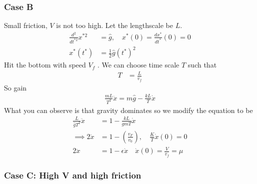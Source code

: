 \documentclass{article}
\theoremstyle{remark}
\begin{document}
   \subsubsection{Case B}%
   \label{ssub:case_b}
   Small friction,  $V$ is not too high. Let the lengthscale be $L$. \[
     \begin{split}
   \frac{d ^2}{d t^{*2}} x^{*2} &=   \hat{g} , \quad  x^{*} \left( 0 \right) = \frac{d x^{*}}{d t^{*}}  \left( 0 \right) = 0 \\
   x^{*} \left( t^{*} \right) &=  \frac{1}{2} \hat{g} \left( t^{*} \right)^2 
     \end{split} 
   \] 
   Hit the bottom with speed $V_{f}$ . We can choose time scale $T$ such that \[
   \begin{split}
     T &=  \frac{L}{v_{f}}   
   \end{split} 
   \] 
   So gain \[
   \begin{split}
     \frac{mL}{T^2}  \ddot{x} = m \hat{g} - \frac{kL}{T}  \dot{x}
   \end{split} 
   \] 
   What you can observe is that gravity dominates so we modify the equation to be \[
     \begin{split}
   \frac{L}{\hat{g} T^2} \ddot{x} &=   1 - \frac{kL}{gmT} \dot{x} \\
   \implies  2 \ddot{x} &=   1 - \left( \frac{v_{F}}{ v_{0}}  \right) , \quad  \frac{K}{T}  \dot{x}\left( 0 \right) = 0 \\
   2\ddot{x} &=   1- \epsilon \dot{x} \quad \dot{x}\left( 0 \right) = \frac{V}{v_{f}}  = \mu  
     \end{split} 
   \] 
   
\subsubsection{Case C:  High V and high friction}%
\label{ssub:j}
\end{document}
